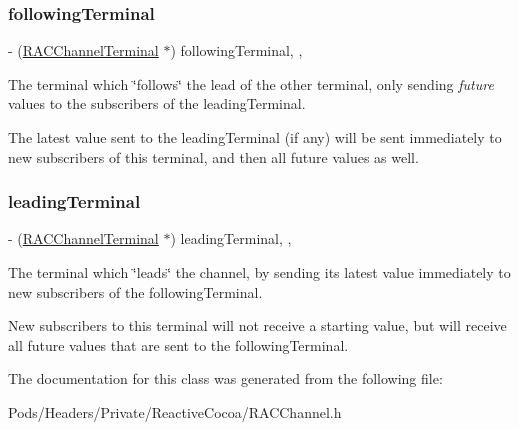\subsubsection{\texorpdfstring{following\+Terminal}{followingTerminal}}
{\footnotesize\ttfamily -\/ (\mbox{\hyperlink{interface_r_a_c_channel_terminal}{R\+A\+C\+Channel\+Terminal}} $\ast$) following\+Terminal\hspace{0.3cm}{\ttfamily [read]}, {\ttfamily [nonatomic]}, {\ttfamily [strong]}}

The terminal which \char`\"{}follows\char`\"{} the lead of the other terminal, only sending {\itshape future} values to the subscribers of the {\ttfamily leading\+Terminal}.

The latest value sent to the {\ttfamily leading\+Terminal} (if any) will be sent immediately to new subscribers of this terminal, and then all future values as well. \mbox{\label{interface_r_a_c_channel_a945eadc4078674ea25b68fd27a671448}} 
\subsubsection{\texorpdfstring{leading\+Terminal}{leadingTerminal}}
{\footnotesize\ttfamily -\/ (\mbox{\hyperlink{interface_r_a_c_channel_terminal}{R\+A\+C\+Channel\+Terminal}} $\ast$) leading\+Terminal\hspace{0.3cm}{\ttfamily [read]}, {\ttfamily [nonatomic]}, {\ttfamily [strong]}}

The terminal which \char`\"{}leads\char`\"{} the channel, by sending its latest value immediately to new subscribers of the {\ttfamily following\+Terminal}.

New subscribers to this terminal will not receive a starting value, but will receive all future values that are sent to the {\ttfamily following\+Terminal}. 

The documentation for this class was generated from the following file\+:\begin{DoxyCompactItemize}
\item 
Pods/\+Headers/\+Private/\+Reactive\+Cocoa/R\+A\+C\+Channel.\+h\end{DoxyCompactItemize}
